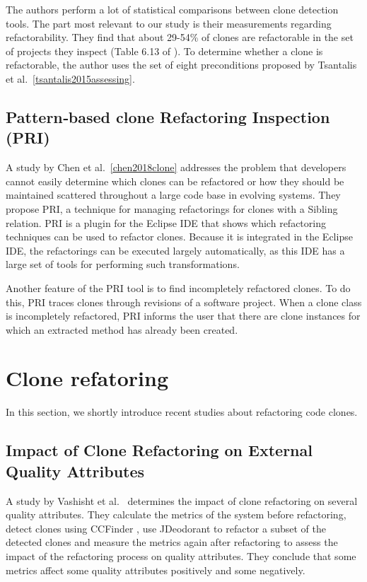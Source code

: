 The authors perform a lot of statistical comparisons between clone detection tools. The part most relevant to our study is their measurements regarding refactorability. They find that about 29-54\% of clones are refactorable in the set of projects they inspect (Table 6.13 of \cite{alwaqfi2017refactoring}). To determine whether a clone is refactorable, the author uses the set of eight preconditions proposed by Tsantalis et al.~\ref{tsantalis2015assessing}. %

\subsection{Pattern‐based clone Refactoring Inspection (PRI)}
A study by Chen et al.~\ref{chen2018clone} %
addresses the problem that developers cannot easily determine which clones can be refactored or how they should be maintained scattered
throughout a large code base in evolving systems. They propose PRI, a technique for managing refactorings for clones with a Sibling relation. PRI is a plugin for the Eclipse IDE that shows which refactoring techniques can be used to refactor clones. Because it is integrated in the Eclipse IDE, the refactorings can be executed largely automatically, as this IDE has a large set of tools for performing such transformations.

Another feature of the PRI tool is to find incompletely refactored clones. To do this, PRI traces clones through revisions of a software project. When a clone class is incompletely refactored, PRI informs the user that there are clone instances for which an extracted method has already been created.

\section{Clone refatoring}
In this section, we shortly introduce recent studies about refactoring code clones.
\subsection{Impact of Clone Refactoring on External Quality Attributes}
A study by Vashisht et al.~\cite{vashisht2018impact} determines the impact of clone refactoring on several quality attributes. They calculate the metrics of the system before refactoring, detect clones using CCFinder \cite{kamiya2002ccfinder}, use JDeodorant to refactor a subset of the detected clones \cite{mazinanian2016jdeodorant} and measure the metrics again after refactoring to assess the impact of the refactoring process on quality attributes. They conclude that some metrics affect some quality attributes positively and some negatively.

